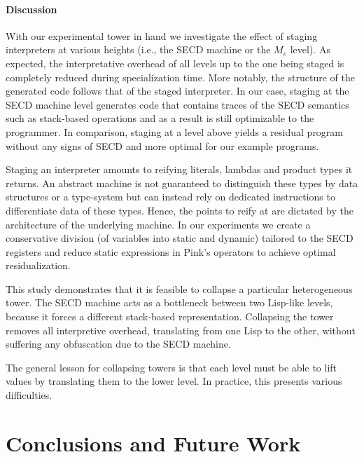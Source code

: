 \documentclass[sigplan,anonymous,review]{acmart}
\newcommand{\mevl}{$M_{e}$}
\theoremstyle{definition}
\begin{document}
\paragraph{Discussion}
With our experimental tower in hand we investigate the effect of staging interpreters at various heights (i.e., the SECD machine or the \mevl{} level). As expected, the interpretative overhead of all levels up to the one being staged is completely reduced during specialization time. More notably, the structure of the generated code follows that of the staged interpreter. In our case, staging at the SECD machine level generates code that contains traces of the SECD semantics such as stack-based operations and as a result is still optimizable to the programmer. In comparison, staging at a level above yields a residual program without any signs of SECD and more optimal for our example programs.

Staging an interpreter amounts to reifying literals, lambdas and product types it returns. An abstract machine is not guaranteed to distinguish these types by data structures or a type-system but can instead rely on dedicated instructions to differentiate data of these types. Hence, the points to reify at are dictated by the architecture of the underlying machine. In our experiments we create a conservative division (of variables into static and dynamic)
tailored to the SECD registers
and reduce static expressions in Pink's operators to achieve optimal residualization.

This study demonstrates that it is feasible to collapse a particular
heterogeneous tower. The SECD machine acts as a bottleneck
between two Lisp-like levels, because it forces a different 
stack-based representation. Collapsing the tower removes
all interpretive overhead, translating from one Lisp to the other,
without suffering any obfuscation due to the SECD machine.

The general lesson for collapsing towers is that each level must be
able to lift values by translating them to the lower level. In
practice, this presents various difficulties.

\section{Conclusions and Future Work}\label{sec:conc}
\end{document}
